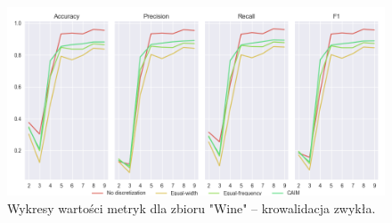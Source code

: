 \begin{figure}[H]
    \includegraphics[width=\textwidth]{img/cv_scores_kfold/scoring_kfold_wine.png}
    \caption{Wykresy wartości metryk dla zbioru "Wine" -- krowalidacja zwykła.}
\end{figure}

